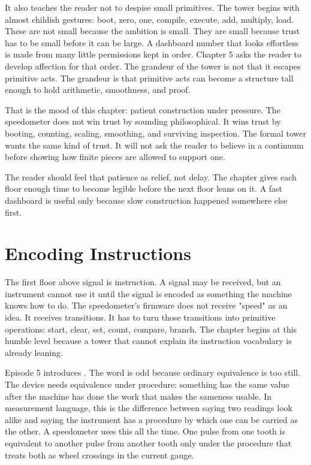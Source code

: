 It also teaches the reader not to despise small primitives. The tower begins
with almost childish gestures: boot, zero, one, compile, execute, add, multiply,
load. These are not small because the ambition is small. They are small because
trust has to be small before it can be large. A dashboard number that looks
effortless is made from many little permissions kept in order. Chapter 5 asks
the reader to develop affection for that order. The grandeur of the tower is
not that it escapes primitive acts. The grandeur is that primitive acts can
become a structure tall enough to hold arithmetic, smoothness, and proof.

That is the mood of this chapter: patient construction under pressure. The
speedometer does not win trust by sounding philosophical. It wins trust by
booting, counting, scaling, smoothing, and surviving inspection. The formal
tower wants the same kind of trust. It will not ask the reader to believe in a
continuum before showing how finite pieces are allowed to support one.

The reader should feel that patience as relief, not delay. The chapter gives
each floor enough time to become legible before the next floor leans on it. A
fast dashboard is useful only because slow construction happened somewhere
else first.

\section{Encoding Instructions}
\label{se:encoding-instructions}

The first floor above signal is instruction. A signal may be received, but an
instrument cannot use it until the signal is encoded as something the machine
knows how to do. The speedometer's firmware does not receive "speed" as an
idea. It receives transitions. It has to turn those transitions into primitive
operations: start, clear, set, count, compare, branch. The chapter begins at
this humble level because a tower that cannot explain its instruction
vocabulary is already leaning.

Episode 5 introduces . The word is odd because ordinary
equivalence is too still. The device needs equivalence under procedure:
something has the same value after the machine has done the work that makes
the sameness usable. In measurement language, this is the difference between
saying two readings look alike and saying the instrument has a procedure by
which one can be carried as the other. A speedometer uses this all the time.
One pulse from one tooth is equivalent to another pulse from another tooth only
under the procedure that treats both as wheel crossings in the current gauge.

